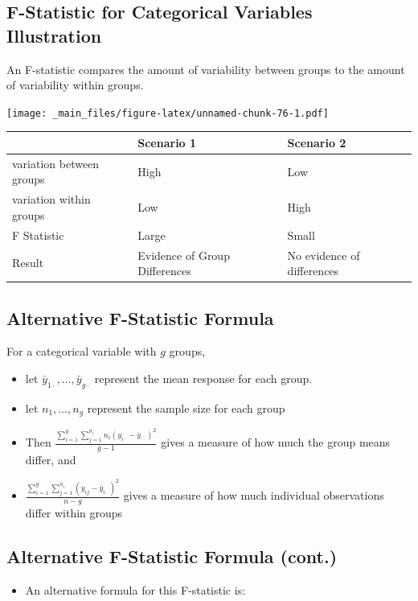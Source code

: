 \documentclass[]{book}
\providecommand{\tightlist}{%
  \setlength{\itemsep}{0pt}\setlength{\parskip}{0pt}}
\begin{document}
\subsection{F-Statistic for Categorical Variables
Illustration}\label{f-statistic-for-categorical-variables-illustration}

An F-statistic compares the amount of variability between groups to the
amount of variability within groups.

\texttt{[image: \_main\_files/figure-latex/unnamed-chunk-76-1.pdf]}

\begin{longtable}[]{@{}lll@{}}
\toprule
& Scenario 1 & Scenario 2\tabularnewline
\midrule
\endhead
variation between groups & High & Low\tabularnewline
variation within groups & Low & High\tabularnewline
F Statistic & Large & Small\tabularnewline
Result & Evidence of Group Differences & No evidence of
differences\tabularnewline
\bottomrule
\end{longtable}

\subsection{Alternative F-Statistic
Formula}\label{alternative-f-statistic-formula}

For a categorical variable with \(g\) groups,

\begin{itemize}
\item
  let \(\bar{y}_{1\cdot}, \ldots, \bar{y}_{g\cdot}\) represent the mean
  response for each group.
\item
  let \(n_1, \ldots, n_g\) represent the sample size for each group
\item
  Then
  \(\frac{\displaystyle\sum_{i=1}^g\sum_{j=1}^{n_i}n_i(y_{i\cdot}-\bar{y}_{\cdot\cdot})^2}{g-1}\)
  gives a measure of how much the group means differ, and
\item
  \(\frac{\displaystyle\sum_{i=1}^g\sum_{j=1}^{n_i}(y_{ij}-\bar{y}_{i\cdot})^2}{n-g}\)
  gives a measure of how much individual observations differ within
  groups
\end{itemize}

\subsection{Alternative F-Statistic Formula
(cont.)}\label{alternative-f-statistic-formula-cont.}

\begin{itemize}
\tightlist
\item
  An alternative formula for this F-statistic is:
\end{itemize}
\end{document}
